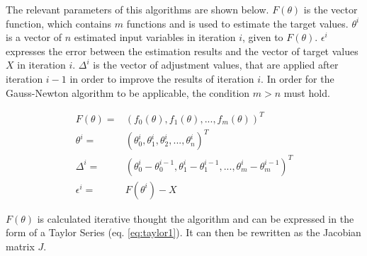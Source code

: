 The relevant parameters of this algorithms are shown below. $F(\theta)$ is the vector function, which contains $m$ functions and is
used to estimate the target values. $\theta^i$ is a vector of $n$ estimated input variables in iteration $i$, given to $F(\theta)$.
$\epsilon^i$ expresses the error between the estimation results and the vector of target values $X$ in iteration $i$.
$\Delta^i$ is the vector of adjustment values, that are applied after iteration $i-1$ in order to improve the results of iteration $i$.
In order for the Gauss-Newton algorithm to be applicable, the condition $m > n$ must hold.

\begin{align}
	F(\theta) =& (f_0(\theta), f_1(\theta),...,f_m(\theta))^T \\
	\theta^{i} =& (\theta^{i}_0, \theta^{i}_1, \theta^{i}_2,...,\theta^{i}_n)^T \\
	\Delta^{i} =& (\theta^{i}_0 - \theta^{i-1}_0, \theta^{i}_1 - \theta^{i-1}_1, ..., \theta^{i}_m - \theta^{i-1}_m)^T \\ %
	\epsilon^{i} =& F(\theta^{i}) - X
\end{align}

$F(\theta)$ is calculated iterative thought the algorithm and can be expressed in the form of a Taylor Series (eq. \ref*{eq:taylor1}). It can
then be rewritten as the Jacobian matrix $J$.

